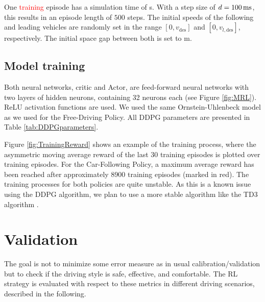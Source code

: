 \documentclass[review]{elsarticle}
\providecommand{\red}[1]{\textcolor{red}{#1}}
\providecommand{\martin}[1]{\red{#1}} %
\providecommand{\sub}[1]{_{\mathrm{#1}}}  %
\providecommand{\3}{{\ss}}
\begin{document}
One \martin{training} episode has a simulation time of \unit[50]{s}.  With a step size of
$d=\unit[100]{ms}$, this results in an episode length of $500$
steps. The initial speeds of the following and leading vehicles are
randomly set in the range $[0,v\sub{des}]$ and $[0,v_{l,\text{des}}]$,
respectively. The initial space gap between both is set to \unit[120]{m}. 

\subsection{Model training}
Both neural networks, critic and Actor, are feed-forward neural networks with two layers of hidden neurons, containing 32 neurons each (see Figure \ref{fig:MRL}). ReLU activation functions are used. We used the same Ornstein-Uhlenbeck model as we used for the Free-Driving Policy.
All DDPG parameters are presented in Table \ref{tab:DDPGparameters}.

Figure \ref{fig:TrainingReward} shows an example of the training
process, where the asymmetric moving average reward of the last 30
training episodes is plotted over training episodes. For the
Car-Following Policy, a maximum average reward has been reached after
approximately 8900 training episodes (marked in red). The training processes for both policies are quite unstable. As this is a known issue using the DDPG algorithm, we plan to use a more stable algorithm like the TD3 algorithm \citep{TD3}.    








\section{Validation}
\label{sec:validation}
The goal is not to minimize some error measure as in usual
calibration/validation but to check if the driving style is safe,
effective, and comfortable. The RL strategy is evaluated with respect to these metrics in different driving scenarios, described in the following.
\end{document}
